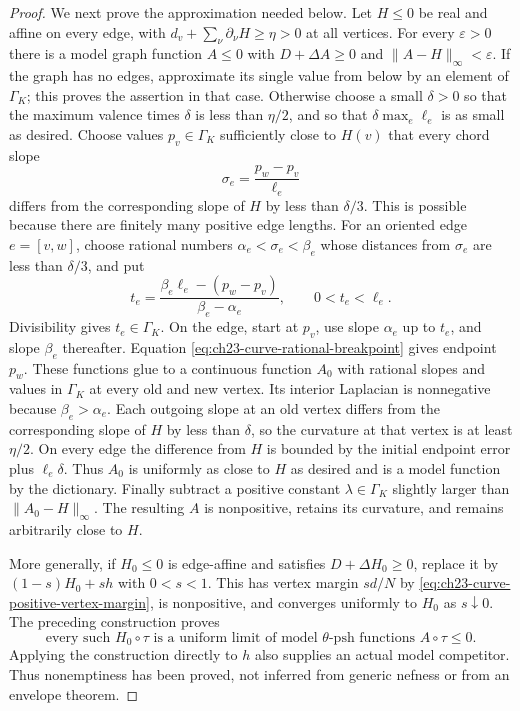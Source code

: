 \begin{proof}
We next prove the approximation needed below.  Let $H\leq0$ be real
and affine on every edge, with
$d_v+\sum_\nu\partial_\nu H\geq\eta>0$ at all vertices.  For every
$\varepsilon>0$ there is a model graph function $A\leq0$ with
$D+\Delta A\geq0$ and $\|A-H\|_\infty<\varepsilon$.
If the graph has no edges, approximate its single value from below by
an element of $\Gamma_K$; this proves the assertion in that case.
Otherwise choose a small $\delta>0$ so that the maximum valence times
$\delta$ is less than $\eta/2$, and so that
$\delta\max_e\ell_e$ is as small as desired.  Choose values
$p_v\in\Gamma_K$ sufficiently close to $H(v)$ that every chord slope
\[
 \sigma_e=\frac{p_w-p_v}{\ell_e}
\]
differs from the corresponding slope of $H$ by less than $\delta/3$.
This is possible because there are finitely many positive edge lengths.
For an oriented edge $e=[v,w]$, choose rational numbers
$\alpha_e<\sigma_e<\beta_e$ whose distances from $\sigma_e$ are less
than $\delta/3$, and put
\begin{equation}
\label{eq:ch23-curve-rational-breakpoint}
 t_e=\frac{\beta_e\ell_e-(p_w-p_v)}{\beta_e-\alpha_e},
 \qquad 0<t_e<\ell_e.
\end{equation}
Divisibility gives $t_e\in\Gamma_K$.  On the edge, start at $p_v$,
use slope $\alpha_e$ up to $t_e$, and slope $\beta_e$ thereafter.
Equation \eqref{eq:ch23-curve-rational-breakpoint} gives endpoint $p_w$.
These functions glue to a continuous function $A_0$ with rational slopes
and values in $\Gamma_K$ at every old and new vertex.  Its interior
Laplacian is nonnegative because $\beta_e>\alpha_e$.  Each outgoing
slope at an old vertex differs from the corresponding slope of $H$ by
less than $\delta$, so the curvature at that vertex is at least
$\eta/2$.  On every edge the difference from $H$ is bounded by the
initial endpoint error plus $\ell_e\delta$.  Thus $A_0$ is uniformly
as close to $H$ as desired and is a model function by the dictionary.
Finally subtract a positive constant $\lambda\in\Gamma_K$ slightly
larger than $\|A_0-H\|_\infty$.  The resulting $A$ is nonpositive,
retains its curvature, and remains arbitrarily close to $H$.

More generally, if $H_0\leq0$ is edge-affine and satisfies
$D+\Delta H_0\geq0$, replace it by
$(1-s)H_0+sh$ with $0<s<1$.  This has vertex margin $sd/N$ by
\eqref{eq:ch23-curve-positive-vertex-margin}, is nonpositive, and converges
uniformly to $H_0$ as $s\downarrow0$.  The preceding construction proves
\begin{equation}
\label{eq:ch23-curve-real-chord-approximation}
 \text{every such }H_0\circ\tau\text{ is a uniform limit of
 model }\theta\text{-psh functions }A\circ\tau\leq0.
\end{equation}
Applying the construction directly to $h$ also supplies an actual model
competitor.  Thus nonemptiness has been proved, not inferred from generic
nefness or from an envelope theorem.


\end{proof}
